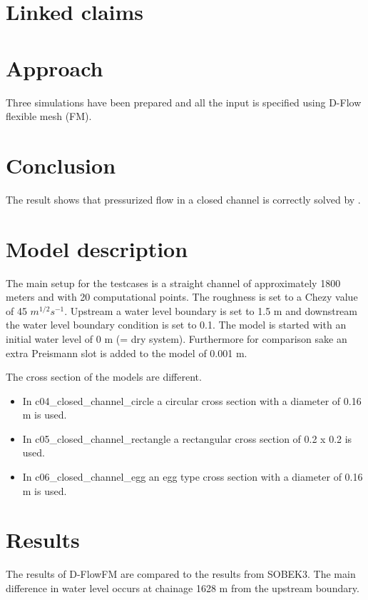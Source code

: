 \section*{Linked claims}


\section*{Approach}
Three simulations have been prepared and all the input is specified using D-Flow flexible mesh (FM). 


\section*{Conclusion} 
The result shows that pressurized flow in a closed channel is correctly solved by \DFLOWFM.

\section*{Model description}
The main setup for the testcases is a straight channel of approximately 1800 meters and with 20 computational points. 
The roughness is set to a Chezy value of 45 $m^{1/2}s^{-1}$. 
Upstream a water level boundary is set to 1.5 m and downstream the water level boundary condition is set to 0.1. 
The model is started with an initial water level of 0 m (= dry system).
Furthermore for comparison sake an extra Preismann slot is added to the model of 0.001 m.

The cross section of the models are different.
\begin{itemize}
	\item In c04\_closed\_channel\_circle a circular cross section with a diameter of 0.16 m is used. 
	\item In c05\_closed\_channel\_rectangle a rectangular cross section of 0.2 x 0.2 is used. 
	\item In c06\_closed\_channel\_egg an egg type cross section with a diameter of 0.16 m is used. 
\end{itemize}


\section*{Results}
The results of D-FlowFM are compared to the results from SOBEK3. 
The main difference in water level occurs at chainage 1628 m from the upstream boundary.


